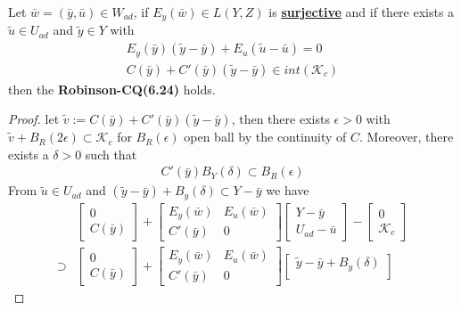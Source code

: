 \begin{lemma}
	Let $\bar{w} = (\bar{y}, \bar{u}) \in W_{ad}$, if $E_y(\bar{w}) \in L(Y, Z)$ is \underline{\textbf{surjective}} and if there exists a $\tilde{u} \in U_{ad}$ and $\tilde{y} \in Y$ with
	\begin{align*}
		E_y(\bar{y})(\tilde{y} - \bar{y}) + E_u(\tilde{u} - \bar{u}) = 0\\
		C(\bar{y}) + C'(\bar{y})(\tilde{y} - \bar{y}) \in int(\mathcal{K}_c)
	\end{align*}
	then the \textbf{Robinson-CQ(6.24)} holds.
\end{lemma}
\begin{proof}
	 let $\tilde{v}:= C(\bar{y}) + C'(\bar{y})(\tilde{y} - \bar{y})$, then there exists $\epsilon > 0$ with $\tilde{v} + B_R(2 \epsilon) \subset \mathcal{K}_c$ for $B_R(\epsilon)$ open ball by the continuity of $C$. Moreover, there exists a $\delta > 0$ such that
	 \begin{align*}
	 	C'(\bar{y}) B_Y(\delta) \subset B_R(\epsilon)
	 \end{align*}
	 From $\tilde{u} \in U_{ad}$ and $(\tilde{y} - \bar{y}) + B_y(\delta) \subset Y - \bar{y}$ we have
	 \begin{align*}
	 	&\begin{bmatrix}
	 		0\\
	 		C(\bar{y})
	 	\end{bmatrix}
	 	+ 
	 	\begin{bmatrix}
	 		E_y(\bar{w}) & E_u(\bar{w})\\
	 		C'(\bar{y}) & 0
	 	\end{bmatrix}
	 	\begin{bmatrix}
	 		Y - \bar{y} \\
	 		U_{ad} - \bar{u} 
	 	\end{bmatrix}
	 	-
	 	\begin{bmatrix}
	 		0\\
	 		\mathcal{K}_c
	 	\end{bmatrix}\\
	 	\supset &
	 	\begin{bmatrix}
	 		0\\
	 		C(\bar{y})
	 	\end{bmatrix}
	 	+ 
	 	\begin{bmatrix}
	 		E_y(\bar{w}) & E_u(\bar{w})\\
	 		C'(\bar{y}) & 0
	 	\end{bmatrix}
	 	\begin{bmatrix}
	 		\tilde{y} - \bar{y} + B_y(\delta)\\

\end{bmatrix}
\end{align*}
\end{proof}
